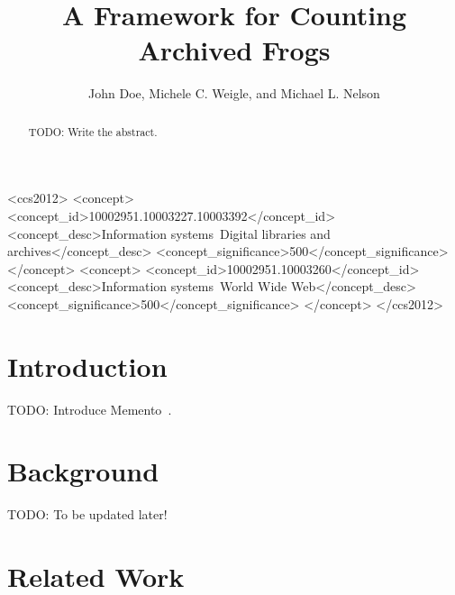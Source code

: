 \documentclass[sigconf]{acmart}
\newcommand{\todo}[1][To be updated later!]{{\color{red} TODO: {#1}}}
\begin{document}
\title{A Framework for Counting Archived Frogs}

\author{John Doe, Michele C. Weigle, and Michael L. Nelson}

\renewcommand{\shortauthors}{J. Doe et al.}


\begin{abstract}
\todo[Write the abstract.]
\end{abstract}


\begin{CCSXML}
<ccs2012>
<concept>
<concept_id>10002951.10003227.10003392</concept_id>
<concept_desc>Information systems~Digital libraries and archives</concept_desc>
<concept_significance>500</concept_significance>
</concept>
<concept>
<concept_id>10002951.10003260</concept_id>
<concept_desc>Information systems~World Wide Web</concept_desc>
<concept_significance>500</concept_significance>
</concept>
</ccs2012>
\end{CCSXML}






\maketitle


\section{Introduction}

\todo[Introduce Memento~\cite{memento:rfc}.]


\section{Background}

\todo


\section{Related Work}
\end{document}
